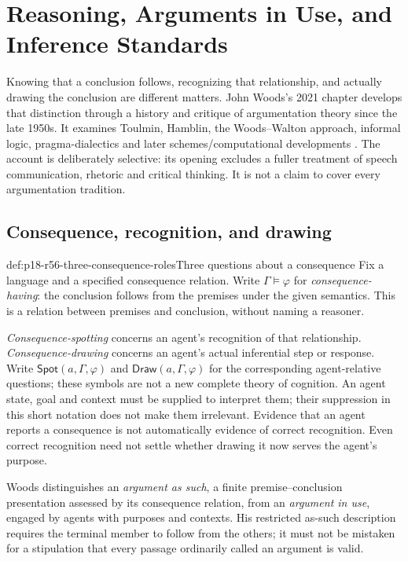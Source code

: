 \chapter{Reasoning, Arguments in Use, and Inference Standards}
\label{sec:p18-rationality-5-6}

Knowing that a conclusion follows, recognizing that relationship, and
actually drawing the conclusion are different matters. John Woods's
2021 chapter develops that distinction through a history and critique
of argumentation theory since the late 1950s. It examines Toulmin,
Hamblin, the Woods--Walton approach, informal logic, pragma-dialectics
and later schemes/computational developments
\cite[pp.~367--374]{Woods2021ReasoningArgumentation}.
The account is deliberately selective: its opening excludes a fuller
treatment of speech communication, rhetoric and critical thinking.
It is not a claim to cover every argumentation tradition.

\section{Consequence, recognition, and drawing}

\begin{hbdefinition}{def:p18-r56-three-consequence-roles}{Three questions about a consequence}
Fix a language and a specified consequence relation. Write
\(\Gamma\models\varphi\) for \emph{consequence-having}: the
conclusion follows from the premises under the given semantics.
This is a relation between premises and conclusion, without naming
a reasoner.

\emph{Consequence-spotting} concerns an agent's recognition of that
relationship. \emph{Consequence-drawing} concerns an agent's actual
inferential step or response. Write
\(\mathsf{Spot}(a,\Gamma,\varphi)\) and
\(\mathsf{Draw}(a,\Gamma,\varphi)\) for the corresponding agent-relative
questions; these symbols are not a new complete theory of cognition.
An agent state, goal and context must be supplied to interpret them;
their suppression in this short notation does not make them irrelevant.
Evidence that an agent reports a consequence is not automatically
evidence of correct recognition. Even correct recognition need not
settle whether drawing it now serves the agent's purpose.

Woods distinguishes an \emph{argument as such}, a finite
premise--conclusion presentation assessed by its consequence relation,
from an \emph{argument in use}, engaged by agents with purposes and
contexts. His restricted as-such description requires the terminal
member to follow from the others; it must not be mistaken for a stipulation that every passage
ordinarily called an argument is valid.
\cite[pp.~367--368]{Woods2021ReasoningArgumentation}
\end{hbdefinition}


